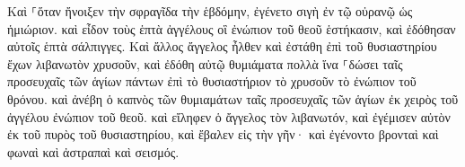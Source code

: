 \documentclass{openreader}
\begin{document}
Καὶ ⸀ὅταν ἤνοιξεν τὴν σφραγῖδα τὴν ἑβδόμην, ἐγένετο σιγὴ ἐν τῷ οὐρανῷ ὡς ἡμιώριον. 
καὶ εἶδον τοὺς ἑπτὰ ἀγγέλους οἳ ἐνώπιον τοῦ θεοῦ ἑστήκασιν, καὶ ἐδόθησαν αὐτοῖς ἑπτὰ σάλπιγγες. 
Καὶ ἄλλος ἄγγελος ἦλθεν καὶ ἐστάθη ἐπὶ τοῦ θυσιαστηρίου ἔχων λιβανωτὸν χρυσοῦν, καὶ ἐδόθη αὐτῷ θυμιάματα πολλὰ ἵνα ⸀δώσει ταῖς προσευχαῖς τῶν ἁγίων πάντων ἐπὶ τὸ θυσιαστήριον τὸ χρυσοῦν τὸ ἐνώπιον τοῦ θρόνου. 
καὶ ἀνέβη ὁ καπνὸς τῶν θυμιαμάτων ταῖς προσευχαῖς τῶν ἁγίων ἐκ χειρὸς τοῦ ἀγγέλου ἐνώπιον τοῦ θεοῦ. 
καὶ εἴληφεν ὁ ἄγγελος τὸν λιβανωτόν, καὶ ἐγέμισεν αὐτὸν ἐκ τοῦ πυρὸς τοῦ θυσιαστηρίου, καὶ ἔβαλεν εἰς τὴν γῆν· καὶ ἐγένοντο βρονταὶ καὶ φωναὶ καὶ ἀστραπαὶ καὶ σεισμός. 
\end{document}
